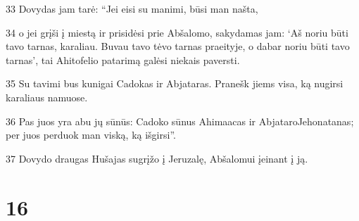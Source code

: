 \par 33 Dovydas jam tarė: “Jei eisi su manimi, būsi man našta, 
\par 34 o jei grįši į miestą ir prisidėsi prie Abšalomo, sakydamas jam: ‘Aš noriu būti tavo tarnas, karaliau. Buvau tavo tėvo tarnas praeityje, o dabar noriu būti tavo tarnas’, tai Ahitofelio patarimą galėsi niekais paversti. 
\par 35 Su tavimi bus kunigai Cadokas ir Abjataras. Pranešk jiems visa, ką nugirsi karaliaus namuose. 
\par 36 Pas juos yra abu jų sūnūs: Cadoko sūnus Ahimaacas ir Abjataro­Jehonatanas; per juos perduok man viską, ką išgirsi”. 
\par 37 Dovydo draugas Hušajas sugrįžo į Jeruzalę, Abšalomui įeinant į ją.



\chapter{16}


